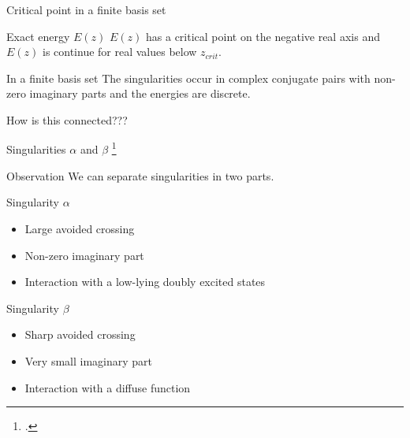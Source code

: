 \documentclass[xcolor=x11names,compress]{beamer}
\renewcommand{\(}{\begin{columns}}
\renewcommand{\)}{\end{columns}}
\newcommand{\<}[1]{\begin{column}{#1}}
\renewcommand{\>}{\end{column}}
\begin{document}
\begin{frame}{Critical point in a finite basis set}

\pause[1]
    
\begin{beamerboxesrounded}[scheme=foncé]{\centering Exact energy $E(z)$}
$E(z)$ has a critical point on the negative real axis and $E(z)$ is continue for real values below $z_{crit}$.
\end{beamerboxesrounded}

\vspace{0.5cm}

\pause[2]

\begin{beamerboxesrounded}[scheme=foncé]{\centering In a finite basis set}
The singularities occur in complex conjugate pairs with non-zero imaginary parts and the energies are discrete. 
\end{beamerboxesrounded}

\vspace{0.5cm}

\pause[3]

\centering \Large{How is this connected???}
    
\end{frame}

\begin{frame}{Singularities $\alpha$ and $\beta$ \footcite{sergeev_singularities_2006}}

\pause[1]

\begin{beamerboxesrounded}[scheme=foncé]{\centering Observation}
We can separate singularities in two parts. 
\end{beamerboxesrounded}   

\pause[2]

\begin{beamerboxesrounded}[scheme=foncé]{\centering Singularity $\alpha$}
\begin{itemize}
    \item Large avoided crossing
    \item Non-zero imaginary part
    \item Interaction with a low-lying doubly excited states
\end{itemize} 
\end{beamerboxesrounded}  

\pause[3]

\begin{beamerboxesrounded}[scheme=foncé]{\centering Singularity $\beta$}
\begin{itemize}
    \item Sharp avoided crossing
    \item Very small imaginary part
    \item Interaction with a diffuse function 
\end{itemize} 
\end{beamerboxesrounded} 

\end{frame}
\end{document}
